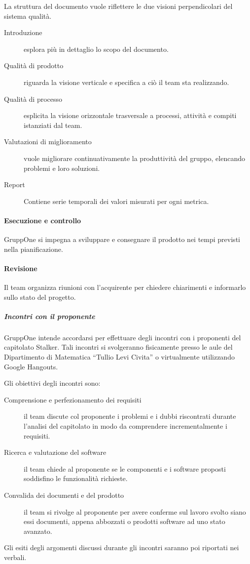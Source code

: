 \documentclass[../../norme-di-progetto.tex]{subfiles}
\begin{document}
La struttura del documento vuole riflettere le due visioni perpendicolari del sistema qualità.

\begin{description}
  \item [Introduzione] esplora più in dettaglio lo scopo del documento.
  \item [Qualità di prodotto] riguarda la visione verticale e specifica a ciò il team sta realizzando.
  \item [Qualità di processo] esplicita la visione orizzontale trasversale a processi, attività e compiti istanziati dal team.
  \item [Valutazioni di miglioramento] vuole migliorare continuativamente la produttività del gruppo, elencando problemi e loro soluzioni.
  \item [Report] Contiene serie temporali dei valori misurati per ogni metrica.
\end{description}

\paragraph{Esecuzione e controllo}%
\label{par:esecuzione e controllo}

GruppOne si impegna a sviluppare e consegnare il prodotto nei tempi previsti nella pianificazione.

\paragraph{Revisione}%
\label{par:revisione}

Il team organizza riunioni con l'acquirente per chiedere chiarimenti e informarlo sullo stato del progetto.

\subparagraph{Incontri con il proponente}%
\label{subp:incontri_con_il_proponente}

GruppOne intende accordarsi per effettuare degli incontri con i proponenti del capitolato Stalker.
Tali incontri si svolgeranno fisicamente presso le aule del Dipartimento di Matematica ``Tullio Levi Civita'' o virtualmente utilizzando Google Hangouts.

Gli obiettivi degli incontri sono:
\begin{description}
  \item [Comprensione e perfezionamento dei requisiti] il team discute col proponente i problemi e i dubbi riscontrati durante l'analisi del capitolato in modo da comprendere incrementalmente i requisiti.
  \item [Ricerca e valutazione del software] il team chiede al proponente se le componenti e i software proposti soddisfino le funzionalità richieste.
  \item [Convalida dei documenti e del prodotto] il team si rivolge al proponente per avere conferme sul lavoro svolto siano essi documenti,  appena abbozzati o prodotti software ad uno stato avanzato.
\end{description}
Gli esiti degli argomenti discussi durante gli incontri saranno poi riportati nei verbali.
\end{document}
